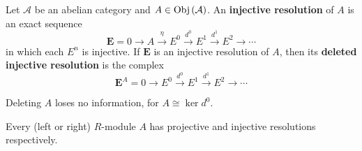 \documentclass[12pt, oneside]{book}
\begin{document}
\begin{definition}
    Let $\mathcal{A}$ be an abelian category and $A\in \operatorname{\operatorname{Obj}}\left(\mathcal{A}\right)$.
    An \textbf{injective resolution} of $A $ is an exact sequence
    \begin{equation*}
        \mathbf{E}
        =
        0 \rightarrow A \xrightarrow{\eta} E^0 \xrightarrow{d^0} E^1 \xrightarrow{d^1} E^2 \rightarrow \cdots
    \end{equation*}
    in which each $E^n$ is injective.
    If $\mathbf{E}$ is an injective resolution of $A$, then its \textbf{deleted injective resolution} is the complex
    \begin{equation*}
        \mathbf{E}^A=0 \rightarrow E^0 \xrightarrow{d^0} E^1 \xrightarrow{d^1} E^2 \rightarrow \cdots
    \end{equation*}
    \begin{remark}
        Deleting $A$ loses no information, for $A \cong \operatorname{ker} d^0$.
    \end{remark}
\end{definition}
\begin{proposition}
    Every (left or right) $R$-module $A$ has projective and injective resolutions respectively.
\end{proposition}
\end{document}
